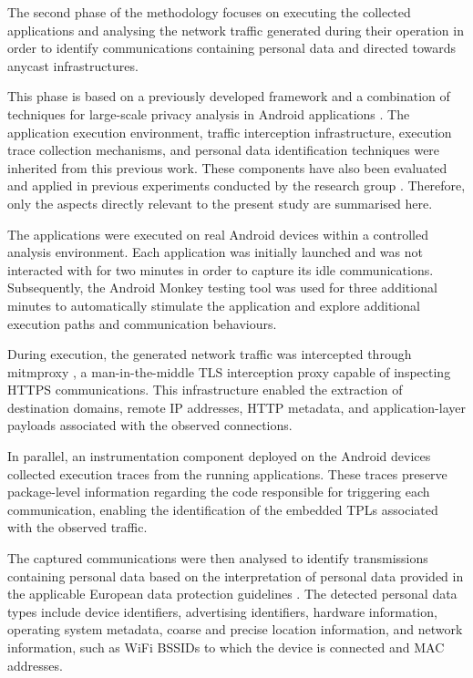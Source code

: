 \documentclass[
A4paper,                %
twoside,                %
openright,              %
chapterprefix=true,     %
12pt,                   %
headings=normal,        %
titlepage=on            %
]{book}
\begin{document}
The second phase of the methodology focuses on executing the collected applications and analysing the network traffic generated during their operation in order to identify communications containing personal data and directed towards anycast infrastructures.

This phase is based on a previously developed framework and a combination of techniques for large-scale privacy analysis in Android applications \cite{Guaman2023AutomatedApplications}. The application execution environment, traffic interception infrastructure, execution trace collection mechanisms, and personal data identification techniques were inherited from this previous work. These components have also been evaluated and applied in previous experiments conducted by the research group \cite{Guaman2021GDPRApps,Jain2023ATLAS:Labels,Guaman2023AutomatedApplications,Pascual2024Hunter:Transfers,Rodriguez2024LargeScale}. Therefore, only the aspects directly relevant to the present study are summarised here.

The applications were executed on real Android devices within a controlled analysis environment. Each application was initially launched and was not interacted with for two minutes in order to capture its idle communications. Subsequently, the Android Monkey testing tool \cite{IUDevelopers} was used for three additional minutes to automatically stimulate the application and explore additional execution paths and communication behaviours.

During execution, the generated network traffic was intercepted through mitmproxy \cite{MitmproxyProxy}, a man-in-the-middle TLS interception proxy capable of inspecting HTTPS communications. This infrastructure enabled the extraction of destination domains, remote IP addresses, HTTP metadata, and application-layer payloads associated with the observed connections.

In parallel, an instrumentation component deployed on the Android devices collected execution traces from the running applications. These traces preserve package-level information regarding the code responsible for triggering each communication, enabling the identification of the embedded TPLs associated with the observed traffic.

The captured communications were then analysed to identify transmissions containing personal data based on the interpretation of personal data provided in the applicable European data protection guidelines \cite{JUSTICEwp260rev.01}. The detected personal data types include device identifiers, advertising identifiers, hardware information, operating system metadata, coarse and precise location information, and network information, such as WiFi BSSIDs to which the device is connected and MAC addresses.
\end{document}
